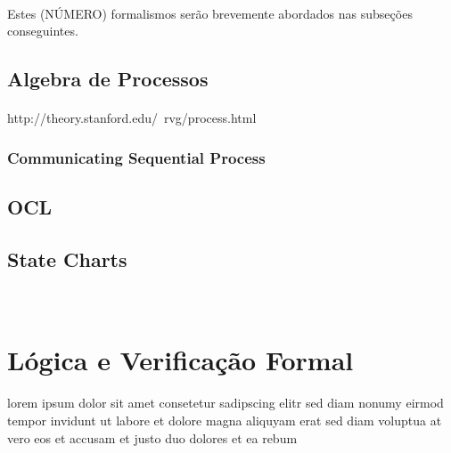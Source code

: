 \paragraph{}
Estes (NÚMERO) formalismos serão brevemente abordados nas subseções conseguintes.

\subsection{Algebra de Processos}
\paragraph{}
http://theory.stanford.edu/~rvg/process.html

\subsubsection{Communicating Sequential Process}
\paragraph{}
\lipsum[1]

\subsection{OCL}
\paragraph{}
\lipsum[1]

\subsection{State Charts}
\paragraph{}
~\cite{Harel:1987:SVF:34884.34886}


\section{Lógica e Verificação Formal}
\paragraph{}
lorem ipsum dolor sit amet consetetur sadipscing elitr sed diam nonumy
eirmod tempor invidunt ut labore et dolore magna aliquyam erat sed diam
voluptua at vero eos et accusam et justo duo dolores et ea rebum


